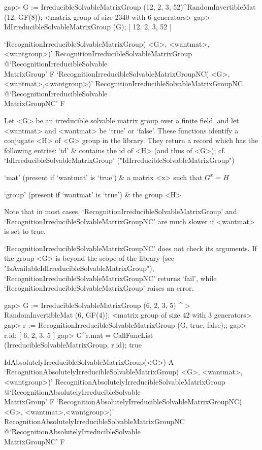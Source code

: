 \beginexample
gap> G := IrreducibleSolvableMatrixGroup (12, 2, 3, 52)^RandomInvertibleMat (12, GF(8));
<matrix group of size 2340 with 6 generators>
gap> IdIrreducibleSolvableMatrixGroup (G);
[ 12, 2, 3, 52 ]
\endexample


\>`RecognitionIrreducibleSolvableMatrixGroup(%
   <G>, <wantmat>, <wantgroup>)'%
{RecognitionIrreducibleSolvableMatrixGroup}%
@{`RecognitionIrreducibleSolvable\\MatrixGroup'} F
\>`RecognitionIrreducibleSolvableMatrixGroupNC(%
   <G>, <wantmat>,<wantgroup>)'%
{RecognitionIrreducibleSolvableMatrixGroupNC}%
@{`RecognitionIrreducibleSolvable\\MatrixGroupNC'} F

Let <G> be an irreducible solvable matrix group over a finite field, and let
<wantmat> and <wantmat> be `true' or `false'. 
These functions identify a conjugate <H> of <G> group in the library. 
They return a record which has the following entries:
\beginitems
`id' &  contains the id of <H> (and thus of
<G>); cf. `IdIrreducibleSolvableMatrixGroup'
("IdIrreducibleSolvableMatrixGroup")

`mat' (present if `wantmat' is `true') &
a
matrix <x> such that $G^x = H$

`group' (present if `wantmat' is `true') & the group <H> 

\enditems
Note that in most cases, `RecognitionIrreducibleSolvableMatrixGroup' and `RecognitionIrreducibleSolvableMatrixGroupNC' are 
much slower if <wantmat> is set to true.   

`RecognitionIrreducibleSolvableMatrixGroupNC' does not check its arguments. If
the group <G> is beyond the scope of the {\IRREDSOL} library (see "IsAvailableIdIrreducibleSolvableMatrixGroup"), `RecognitionIrreducibleSolvableMatrixGroupNC' returns `fail', while `RecognitionIrreducibleSolvableMatrixGroup' raises an error.

\beginexample
gap> G := IrreducibleSolvableMatrixGroup (6, 2, 3, 5) ^
>         RandomInvertibleMat (6, GF(4));
<matrix group of size 42 with 3 generators>
gap> r := RecognitionIrreducibleSolvableMatrixGroup (G, true, false);;
gap> r.id;
[ 6, 2, 3, 5 ]
gap> G^r.mat = CallFuncList (IrreducibleSolvableMatrixGroup, r.id);
true
\endexample


\>IdAbsolutelyIrreducibleSolvableMatrixGroup(<G>) A
\>`RecognitionAbsolutelyIrreducibleSolvableMatrixGroup(%
   <G>, <wantmat>, <wantgroup>)'%
{RecognitionAbsolutelyIrreducibleSolvableMatrixGroup}%
@{`RecognitionAbsolutelyIrreducibleSolvable\\MatrixGroup'} F
\>`RecognitionAbsolutelyIrreducibleSolvableMatrixGroupNC(%
   <G>, <wantmat>,<wantgroup>)'%
{RecognitionAbsolutelyIrreducibleSolvableMatrixGroupNC}%
@{`RecognitionAbsolutelyIrreducibleSolvable\\MatrixGroupNC'} F

